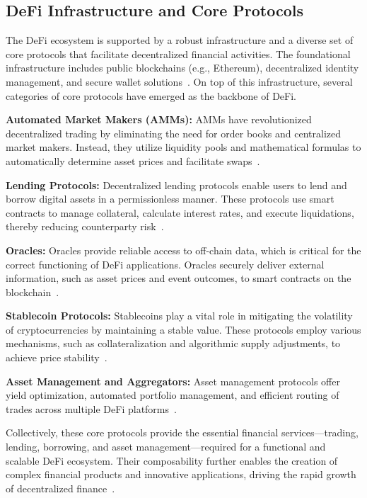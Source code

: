 \documentclass[conference]{IEEEtran}
\begin{document}
\subsection{DeFi Infrastructure and Core Protocols}

The DeFi ecosystem is supported by a robust infrastructure and a diverse set of core protocols that facilitate decentralized financial activities. The foundational infrastructure includes public blockchains (e.g., Ethereum), decentralized identity management, and secure wallet solutions~\cite{xu2021sok, wood2014ethereum}. On top of this infrastructure, several categories of core protocols have emerged as the backbone of DeFi.

\textbf{Automated Market Makers (AMMs):} AMMs have revolutionized decentralized trading by eliminating the need for order books and centralized market makers. Instead, they utilize liquidity pools and mathematical formulas to automatically determine asset prices and facilitate swaps~\cite{werner2021sok}.

\textbf{Lending Protocols:} Decentralized lending protocols enable users to lend and borrow digital assets in a permissionless manner. These protocols use smart contracts to manage collateral, calculate interest rates, and execute liquidations, thereby reducing counterparty risk~\cite{xu2021sok}.

\textbf{Oracles:} Oracles provide reliable access to off-chain data, which is critical for the correct functioning of DeFi applications. Oracles securely deliver external information, such as asset prices and event outcomes, to smart contracts on the blockchain~\cite{werner2021sok}.

\textbf{Stablecoin Protocols:} Stablecoins play a vital role in mitigating the volatility of cryptocurrencies by maintaining a stable value. These protocols employ various mechanisms, such as collateralization and algorithmic supply adjustments, to achieve price stability~\cite{xu2021sok}.

\textbf{Asset Management and Aggregators:} Asset management protocols offer yield optimization, automated portfolio management, and efficient routing of trades across multiple DeFi platforms~\cite{werner2021sok}.

Collectively, these core protocols provide the essential financial services—trading, lending, borrowing, and asset management—required for a functional and scalable DeFi ecosystem. Their composability further enables the creation of complex financial products and innovative applications, driving the rapid growth of decentralized finance~\cite{werner2021sok,xu2021sok}.
\end{document}
